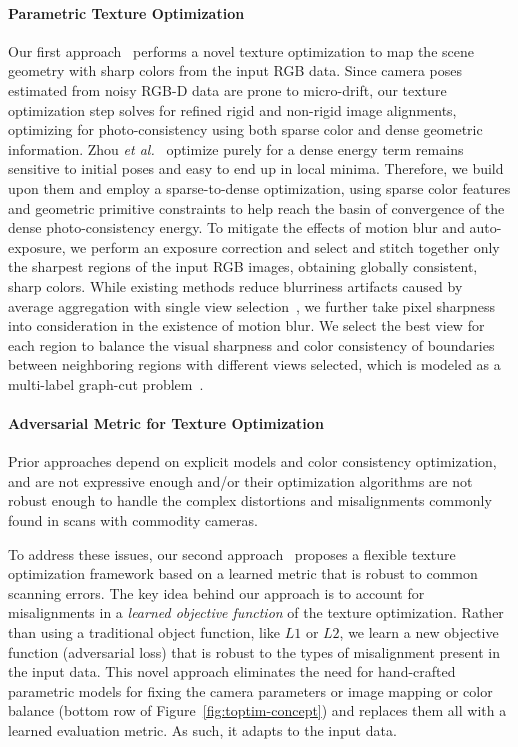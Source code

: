\paragraph*{Parametric Texture Optimization}
Our first approach~\cite{huang20173dlite} performs a novel texture optimization to map the scene geometry with sharp colors from the input RGB data.
Since camera poses estimated from noisy RGB-D data are prone to micro-drift, our texture optimization step solves for refined rigid and non-rigid image alignments, optimizing for photo-consistency using both sparse color and dense geometric information.
%
Zhou \textit{et al.}~\cite{zhou2014color} optimize purely for a dense energy term remains sensitive to initial poses and easy to end up in local minima. Therefore, we build upon them and employ a sparse-to-dense optimization, using sparse color features and geometric primitive constraints to help reach the basin of convergence of the dense photo-consistency energy.
%
To mitigate the effects of motion blur and auto-exposure, we perform an exposure correction and select and stitch together only the sharpest regions of the input RGB images, obtaining globally consistent, sharp colors. While existing methods reduce blurriness artifacts caused by average aggregation with single view selection~\cite{dessein2014seamless}, we further take pixel sharpness into consideration in the existence of motion blur. We select the best view for each region to balance the visual sharpness and color consistency of boundaries between neighboring regions with different views selected, which is modeled as a multi-label graph-cut problem~\cite{boykov2001fast}.

\paragraph*{Adversarial Metric for Texture Optimization}
Prior approaches depend on explicit models and color consistency optimization, and are not expressive enough and/or their optimization algorithms are not robust enough to handle the complex distortions and misalignments commonly found in scans with commodity cameras.

To address these issues, our second approach~\cite{huang2020adversarial} proposes a flexible texture optimization framework based on a learned metric that is robust to common scanning errors.
 The key idea behind our approach is to account for misalignments in a {\em learned objective function} of the texture optimization.   
 Rather than using a traditional object function, like $L1$ or $L2$, we learn a new objective function (adversarial loss) that is robust to the types of misalignment present in the input data.  This novel approach eliminates the need for hand-crafted parametric models for fixing the camera parameters \cite{zhou2014color,huang20173dlite} or image mapping \cite{bi2017patch,zhou2014color} or color balance \cite{huang20173dlite} (bottom row of Figure~\ref{fig:toptim-concept}) and replaces them all with a learned evaluation metric.   As such, it adapts to the input data.
 
